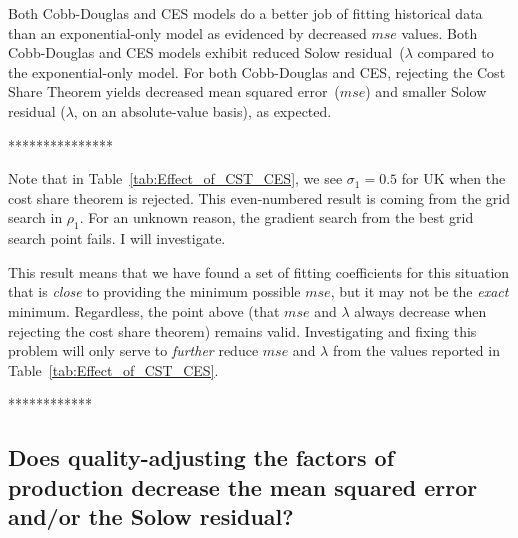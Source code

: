 \documentclass[preprint,authoryear,12pt]{elsarticle}\usepackage[]{graphicx}\usepackage[]{color}
\begin{document}
%
Both Cobb-Douglas and CES models do a better job of fitting 
historical data than an exponential-only model
as evidenced by decreased $mse$ values.
Both Cobb-Douglas and CES models exhibit reduced Solow residual~($\lambda$
compared to the exponential-only model.
For both Cobb-Douglas and CES, rejecting the Cost Share Theorem yields
decreased mean squared error~($mse$) and
smaller Solow residual ($\lambda$, on an absolute-value basis),
as expected.

***************

Note that in Table~\ref{tab:Effect_of_CST_CES}, we see $\sigma_1 = 0.5$ 
for UK when the cost share theorem is rejected. 
This even-numbered result is coming from the grid search in $\rho_1$. 
For an unknown reason, the gradient search from the best grid search point
fails.
I will investigate.

This result means that we have found a set of fitting coefficients
for this situation 
that is \emph{close} to providing the minimum possible $mse$,
but it may not be the \emph{exact} minimum.
Regardless, the point above (that $mse$ and $\lambda$ always decrease 
when rejecting the cost share theorem) remains valid.
Investigating and fixing this problem
will only serve to \emph{further} reduce $mse$ and $\lambda$ 
from the values reported in Table~\ref{tab:Effect_of_CST_CES}.

************


\subsection{Does quality-adjusting the factors of production 
            decrease the mean squared error and/or the Solow residual?} 
\label{sec:quality_adj_energy_and_solow_residual}
\end{document}
